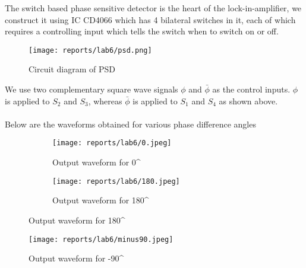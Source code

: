 \documentclass[12pt]{article}
\begin{document}
        The switch based phase sensitive detector is the heart of the lock-in-amplifier, we construct it using IC CD4066 which has 4 bilateral switches in it, each of which requires a controlling input which tells the switch when to switch on or off.
        \begin{figure}[H]
            \centering
            \texttt{[image: reports/lab6/psd.png]}
            \caption{Circuit diagram of PSD}
        \end{figure}
        \noindent
        We use two complementary square wave signals \(\phi\) and \(\bar \phi\) as the control inputs. \(\phi\) is applied to \(S_2\) and \(S_3\), whereas \(\bar \phi\) is applied to \(S_1\) and \(S_4\) as shown above.\\\\
        Below are the waveforms obtained for various phase difference angles
        \begin{figure}[H]
            \centering
            \begin{subfigure}{.5\textwidth}
                \centering
                \texttt{[image: reports/lab6/0.jpeg]}
                \caption{Output waveform for 0^{\circ}}
            \end{subfigure}%
            \begin{subfigure}{.5\textwidth}
                \centering
                \texttt{[image: reports/lab6/180.jpeg]}
                \caption{Output waveform for 180^{\circ}}
            \end{subfigure}%
        \end{figure}
        \begin{figure}[H]
            \centering
            \texttt{[image: reports/lab6/minus90.jpeg]}
            \caption{Output waveform for -90^{\circ}}
        \end{figure}
        \noindent
    
\end{document}
